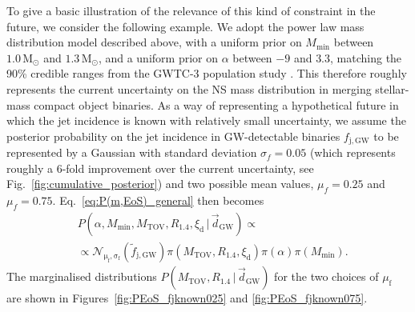 \documentclass[]{aa}
\newcommand{\resp}[1]{#1}
\newcommand{\resptwo}[1]{#1}
\begin{document}
To \resp{give a basic illustration of the relevance of this kind of constraint in the future,} we consider \resp{the following example}. We adopt the power law mass distribution model \resp{described above}, with a uniform prior on $M_\mathrm{min}$ between $1.0\,\mathrm{M_\odot}$ and $1.3\,\mathrm{M_\odot}$, and a uniform prior on $\alpha$ between $-9$ and $3.3$, \resp{matching the 90\% credible ranges from the GWTC-3 population study \citep{LVC2021_GWTC3pop}}. \resp{This therefore roughly represents the current uncertainty on the NS mass distribution in merging stellar-mass compact object binaries. As a way of representing a hypothetical future in which the jet incidence is known with relatively small uncertainty, we} assume the posterior probability on the jet \resp{incidence in GW-detectable binaries} $f_\mathrm{j,GW}$ to be represented by a Gaussian with standard deviation $\sigma_{f}=0.05$ \resptwo{(which represents roughly a 6-fold improvement over the current uncertainty, see Fig.~\ref{fig:cumulative_posterior})} \resp{and two possible mean values, $\mu_f=0.25$ and $\mu_f=0.75$}. Eq.~\ref{eq:P(m,EoS)_general} then becomes
\begin{equation}
\begin{split}
 & P(\alpha,M_\mathrm{min},M_\mathrm{TOV},R_{1.4},\xi_\mathrm{d}\,|\,\vec d_\mathrm{GW})\propto \\
 & \propto\mathcal{N}_{\mathrm{\mu_f},\mathrm{\sigma_f}}(\tilde f_\mathrm{j,GW})\pi(M_\mathrm{TOV},R_{1.4},\xi_\mathrm{d})\pi(\alpha)\pi(M_\mathrm{min}).
\end{split} 
\end{equation}
The marginalised distributions $P(M_\mathrm{TOV},R_{1.4}\,|\,\vec d_\mathrm{GW})$ \resp{for the two choices of $\mu_\mathrm{f}$} are shown in Figures~\ref{fig:PEoS_fjknown025} \resp{and \ref{fig:PEoS_fjknown075}}.
%
\end{document}
